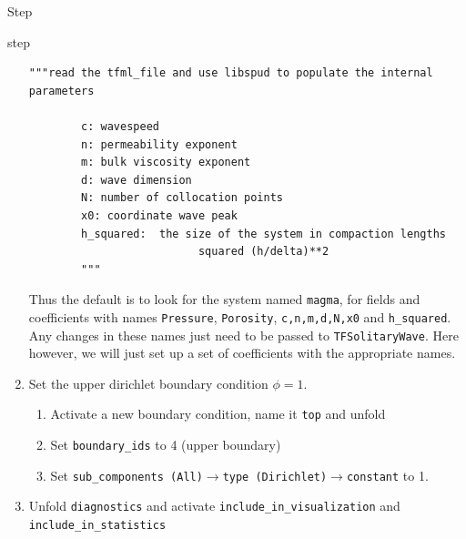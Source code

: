 \begin{steps}{Step}
\begin{steps}{step}
\begin{enumerate}
\begin{lstlisting}[style=Python]
     """read the tfml_file and use libspud to populate the internal parameters

        c: wavespeed
        n: permeability exponent
        m: bulk viscosity exponent
        d: wave dimension
        N: number of collocation points
        x0: coordinate wave peak
        h_squared:  the size of the system in compaction lengths
                          squared (h/delta)**2
        """
\end{lstlisting}
Thus the default is to look for the system named \texttt{magma}, for
fields and coefficients with names \texttt{Pressure},
\texttt{Porosity}, \texttt{c,n,m,d,N,x0} and \texttt{h\_squared}.  Any
changes in these names just need to be passed to
\texttt{TFSolitaryWave}.  Here however, we will just set up a set of
coefficients with the appropriate names.
        \item Set the upper dirichlet boundary condition $\phi=1$.
    \begin{enumerate}
    \item Activate a new boundary condition, name it \texttt{top} and unfold
    \item Set \texttt{boundary\_ids} to 4 (upper boundary)
    \item Set \texttt{sub\_components (All)}$\rightarrow$\texttt{type
        (Dirichlet)}$\rightarrow$\texttt{constant} to 1.
    \end{enumerate}
  \item Unfold \texttt{diagnostics} and activate
      \texttt{include\_in\_visualization} and \texttt{include\_in\_statistics}

    \end{enumerate}


\end{steps}
\end{steps}
